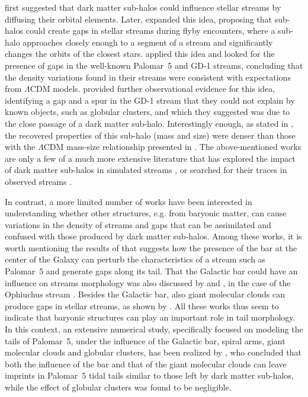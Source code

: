 \documentclass{aa}
\begin{document}
  \citet{2002MNRAS.332..915I} first suggested that dark matter sub-halos could influence stellar streams by diffusing their orbital elements. Later, \citet{2012ApJ...748...20C} expanded this idea, proposing that sub-halos could create gaps in stellar streams during flyby encounters, where a sub-halo approaches closely enough to a segment of a stream and significantly changes the orbits of the closest stars.  \citet{2012ApJ...760...75C, 2013ApJ...768..171C} applied this idea and looked for the presence of gaps in the well-known Palomar~5 and GD-1 streams, concluding that the density variations found in their streams were consistent with expectations from $\Lambda$CDM models. \citet{2019ApJ...880...38B} provided further observational evidence for this idea, identifying a gap and a spur in the GD-1 stream that they could not explain by known objects, such as globular clusters, and which they suggested was due to the close passage of a dark matter sub-halo. Interestingly enough, as stated in \citet{2019ApJ...880...38B}, the recovered properties of this sub-halo (mass and size) were denser than those with the $\Lambda$CDM mass-size relationship presented in \cite{2017MNRAS.466.4974M}. The above-mentioned works are only a few of a much more extensive literature that has explored the impact of dark matter sub-halos in simulated streams \citep{2016ApJ...828L..10H, 2021MNRAS.507.1999H, 2021JCAP...10..043B, 2024arXiv240402953H, 2024arXiv241021174N}, or searched for their traces in observed streams \citep{2016MNRAS.460.2711T, 2017MNRAS.470...60E, 2020ApJ...889...70B, 2020ApJ...892L..37B}.

  In contrast, a more limited number of works have been interested in understanding whether other structures, e.g. from baryonic matter, can cause variations in the density of streams and gaps that can be assimilated and confused with those produced by dark matter sub-halos.  Among these works, it is worth mentioning the results of \citet{2017NatAs...1..633P} that suggests how the presence of the bar at the center of the Galaxy can perturb the characteristics of a stream such as Palomar~5 and generate gaps along its tail. That the Galactic bar could have an influence on streams morphology was also discussed by \citet{2016MNRAS.460..497H} and \citet{2016ApJ...824..104P}, in the case of the Ophiuchus stream \citep{2014MNRAS.443L..84B}. Besides the Galactic bar, also giant molecular clouds can produce gaps in stellar streams, as shown by \citet{2016MNRAS.463L..17A}. All these works thus seem to indicate that baryonic structures can play an important role in tail morphology. In this context,  an extensive numerical study, specifically focused on modeling the tails of Palomar~5, under the influence of the Galactic bar, spiral arms, giant molecular clouds and globular clusters, has been realized by \citet{2019MNRAS.484.2009B}, who concluded that both the influence of the bar and that of the giant molecular clouds can leave imprints in Palomar~5 tidal tails similar to those left by dark matter sub-halos, while the effect of globular clusters was found to be negligible. 
  
\end{document}

